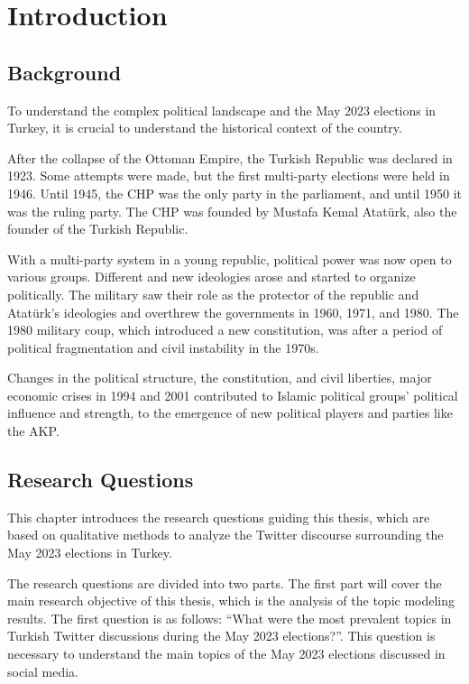 
\chapter{Introduction}\label{chapter:introduction}

\section{Background}

To understand the complex political landscape and the May 2023 elections in Turkey, 
it is crucial to understand the historical context of the country.

After the collapse of the Ottoman Empire, the Turkish Republic was declared in 1923.
Some attempts were made, but the first multi-party elections were held in 1946. 
Until 1945, the \ac{CHP} was the only party in the parliament, and until 1950 it was the ruling party.
The \ac{CHP} was founded by Mustafa Kemal Atatürk, also the founder of the Turkish Republic.

With a multi-party system in a young republic, political power was now open to various groups.
Different and new ideologies arose and started to organize politically.
The military saw their role as the protector of the republic and Atatürk's ideologies 
and overthrew the governments in 1960, 1971, and 1980.
The 1980 military coup, which introduced a new constitution, was after a period of
political fragmentation and civil instability in the 1970s. 

Changes in the political structure, the constitution, and civil liberties, major economic crises in 1994 and 2001
contributed to Islamic political groups' political influence and strength, 
to the emergence of new political players and parties like the \ac{AKP}.



\section{Research Questions}

This chapter introduces the research questions guiding this thesis,
which are based on qualitative methods to analyze the Twitter discourse surrounding the May 2023 elections in Turkey.


The research questions are divided into two parts.
The first part will cover the main research objective of this thesis, 
which is the analysis of the topic modeling results. The first question is as follows:
``What were the most prevalent topics in Turkish Twitter discussions during the May 2023 elections?''.
This question is necessary to understand the main topics of the May 2023 elections discussed in social media.

